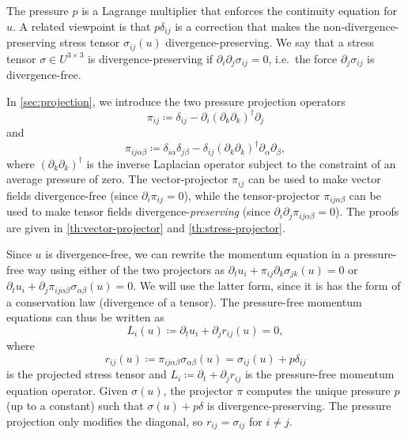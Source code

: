 \documentclass[preprint,twocolumn,5p]{elsarticle}
\begin{document}
The pressure $p$ is a Lagrange multiplier that enforces the continuity equation
for $u$. A related viewpoint is that $p \delta_{i j}$ is a correction that makes the
non-divergence-preserving stress tensor $\sigma_{i j}(u)$ divergence-preserving.
We say that a stress tensor $\sigma \in U^{3 \times 3}$ is divergence-preserving
if $\partial_i \partial_j \sigma_{i j} = 0$,
i.e.\ the force $\partial_j \sigma_{i j}$ is divergence-free.

In \ref{sec:projection}, we introduce the two pressure projection
operators
\begin{equation}
    \pi_{i j} \coloneq \delta_{i j} -
    \partial_i \left(\partial_k \partial_k\right)^{\dagger} \partial_j
\end{equation}
and 
\begin{equation}
    \pi_{i j \alpha \beta} \coloneq
    \delta_{i \alpha} \delta_{j \beta} -
    \delta_{i j} \left(\partial_k \partial_k\right)^{\dagger} \partial_\alpha
    \partial_\beta,
\end{equation}
where $(\partial_k \partial_k)^{\dagger}$
is the inverse Laplacian operator subject to the constraint
of an average pressure of zero.
The vector-projector $\pi_{i j}$ can be used to make vector fields
divergence-free (since $\partial_i \pi_{i j} = 0$), while 
the tensor-projector
$\pi_{i j \alpha \beta}$ can be used to make tensor fields
divergence-\emph{preserving} (since $\partial_i \partial_j \pi_{i j \alpha \beta} = 0$).
The proofs are given in \cref{th:vector-projector} and \cref{th:stress-projector}.

Since $u$ is divergence-free, we can rewrite the
momentum equation in a pressure-free way
using either of the two projectors as $\partial_t u_i + \pi_{i
j} \partial_k \sigma_{j k}(u) = 0$ or
$\partial_t u_i + \partial_j \pi_{i j \alpha \beta} \sigma_{\alpha \beta}(u) = 0$.
We will use the latter form, since it is has the form of a conservation law
(divergence of a tensor).
The pressure-free momentum equations can thus be written as
\begin{equation} \label{eq:momentum-projected}
    L_i(u) \coloneq \partial_t u_i + \partial_j r_{i j}(u) = 0,
\end{equation}
where
\begin{equation}
    r_{i j}(u) \coloneq \pi_{i j \alpha \beta} \sigma_{\alpha \beta}(u)
    = \sigma_{i j}(u) + p \delta_{i j}
\end{equation}
is the projected stress tensor and $L_i \coloneq \partial_t + \partial_j r_{i j}$
is the pressure-free momentum
equation operator. Given $\sigma(u)$,
the projector $\pi$ computes the unique pressure
$p$ (up to a constant) such that $\sigma(u) + p \delta$ is
divergence-preserving. The pressure projection only modifies the
diagonal, so $r_{i j} = \sigma_{i j}$ for $i \neq j$.
\end{document}
